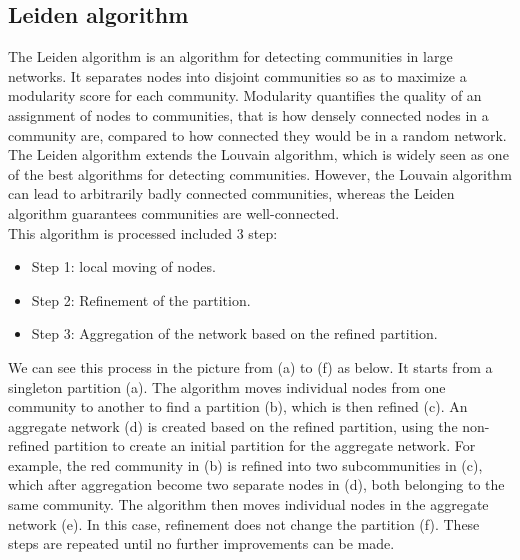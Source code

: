 \subsection{Leiden algorithm}
The Leiden algorithm is an algorithm for detecting communities in large networks. It separates nodes into disjoint communities so as to maximize a modularity score for each community. Modularity quantifies the quality of an assignment of nodes to communities, that is how densely connected nodes in a community are, compared to how connected they would be in a random network. The Leiden algorithm extends the Louvain algorithm, which is widely seen as one of the best algorithms for detecting communities. However, the Louvain algorithm can lead to arbitrarily badly connected communities, whereas the Leiden algorithm guarantees communities are well-connected.\\
This algorithm is processed included 3 step:\\
\begin{itemize}
    \item Step 1: local moving of nodes.
    \item Step 2: Refinement of the partition.
    \item Step 3: Aggregation of the network based on the refined partition.
\end{itemize}
We can see this process in the picture from (a) to (f) as below. It starts from a singleton partition (a). The algorithm moves individual nodes from one community to another to find a partition (b), which is then refined (c). An aggregate network (d) is created based on the refined partition, using the non-refined partition to create an initial partition for the aggregate network. For example, the red community in (b) is refined into two subcommunities in (c), which after aggregation become two separate nodes in (d), both belonging to the same community. The algorithm then moves individual nodes in the aggregate network (e). In this case, refinement does not change the partition (f). These steps are repeated until no further improvements can be made.
